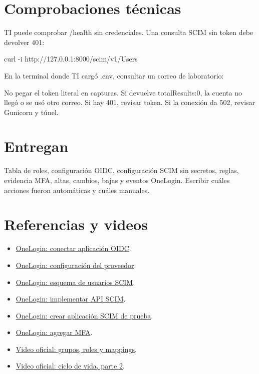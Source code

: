 \documentclass[12pt,a4paper]{article}
\begin{document}
\section*{Comprobaciones técnicas}
TI puede comprobar \textnormal{/\allowbreak{}health} sin credenciales. Una consulta SCIM sin token debe devolver 401:\par
{}
\begin{Comandos}
curl -i http://127.0.0.1:8000/scim/v1/Users
\end{Comandos}
En la terminal donde TI cargó \textnormal{.env}, consultar un correo de laboratorio:\par
{}
No pegar el token literal en capturas. Si devuelve \textnormal{totalResults:0}, la cuenta no llegó o se usó otro correo. Si hay 401, revisar token. Si la conexión da 502, revisar Gunicorn y túnel.\par
{}\section*{Entregan}
Tabla de roles, configuración OIDC, configuración SCIM sin secretos, reglas, evidencia MFA, altas, cambios, bajas y eventos OneLogin. Escribir cuáles acciones fueron automáticas y cuáles manuales.\par
\Needspace{5\baselineskip}\section*{Referencias y videos}
\begin{itemize}
\item \href{https://developers.onelogin.com/docs/openid-connect/connect-to-onelogin/}{OneLogin: conectar aplicación OIDC}.
\item \href{https://developers.onelogin.com/docs/openid-connect/api/provider-config/}{OneLogin: configuración del proveedor}.
\item \href{https://developers.onelogin.com/docs/scim/define-user-schema/}{OneLogin: esquema de usuarios SCIM}.
\item \href{https://developers.onelogin.com/docs/scim/implement-scim-api/}{OneLogin: implementar API SCIM}.
\item \href{https://developers.onelogin.com/docs/scim/create-app/}{OneLogin: crear aplicación SCIM de prueba}.
\item \href{https://www.onelogin.com/getting-started/free-trial-plan/add-mfa}{OneLogin: agregar MFA}.
\item \href{https://www.onelogin.com/video/groups-roles-and-mappings-oh-my}{Video oficial: grupos, roles y mappings}.
\item \href{https://www.onelogin.com/resource-center/videos/getting-started-with-identity-lifecycle-management-pt-2}{Video oficial: ciclo de vida, parte 2}.
\end{itemize}
\end{document}
